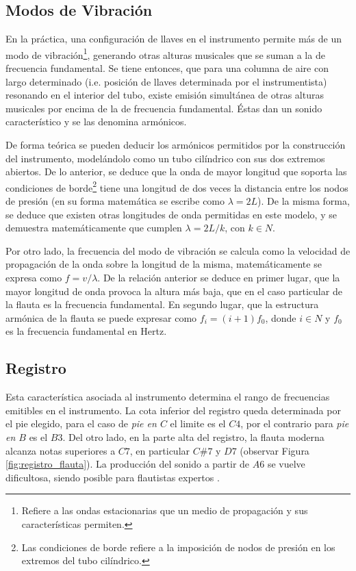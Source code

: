 \documentclass
  [ams,pdfout]%
	{aeslac}
\begin{document}
%
\subsection*{Modos de Vibración}

En la práctica, una configuración de llaves en el instrumento permite más de un modo de vibración\footnote{Refiere a las ondas estacionarias que un medio de propagación y sus características permiten.}, generando otras alturas musicales que se suman a la de frecuencia fundamental. Se tiene entonces, que para una columna de aire con largo determinado (i.e. posición de llaves determinada por el instrumentista) resonando en el interior del tubo, existe emisión simultánea de otras alturas musicales por encima de la de frecuencia fundamental. Éstas dan un sonido característico y se las denomina armónicos. 

%
De forma teórica se pueden deducir los armónicos permitidos por la construcción del instrumento, modelándolo como un tubo cilíndrico con sus dos extremos abiertos. De lo anterior, se deduce que la onda de mayor longitud que soporta las condiciones de borde\footnote{Las condiciones de borde refiere a la imposición de nodos de presión en los extremos del tubo cilíndrico.} tiene una longitud de dos veces la distancia entre los nodos de presión (en su forma matemática se escribe como $\lambda=2L$). De la misma forma, se deduce que existen otras longitudes de onda permitidas en este modelo, y se demuestra matemáticamente que cumplen $\lambda=2L/k$, con $k \in N$.

%
Por otro lado, la frecuencia del modo de vibración se calcula como la velocidad de propagación de la onda sobre la longitud de la misma, matemáticamente se expresa como $f=v/\lambda$. De la relación anterior se deduce en primer lugar, que la mayor longitud de onda provoca la altura más baja, que en el caso particular de la flauta es la frecuencia fundamental. En segundo lugar, que la estructura armónica de la flauta se puede expresar como $f_{i}=(i+1)f_{0}$, donde $i \in N$ y $f_{0}$ es la frecuencia fundamental en Hertz. 

%
\subsection*{Registro}

Esta característica asociada al instrumento determina el rango de frecuencias emitibles en el instrumento. La cota inferior del registro queda determinada por el pie elegido, para el caso de \textit{pie en $C$} el limite es el $C4$, por el contrario para \textit{pie en $B$} es el $B3$. Del otro lado, en la parte alta del registro, la flauta moderna alcanza notas superiores a $C7$, en particular $C\#7$ y $D7$ (observar Figura \ref{fig:registro_flauta}). La producción del sonido a partir de $A6$ se vuelve dificultosa, siendo posible para flautistas expertos \cite{samuel2002study}.
\end{document}
